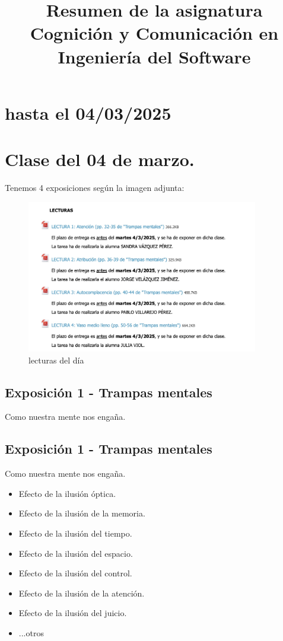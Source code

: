 \documentclass[12pt, a4paper, twoside]{article}
\title{Resumen de la asignatura Cognición y Comunicación en Ingeniería del Software}
\begin{document}
\maketitle

\section{hasta el 04/03/2025}

\section{Clase del 04 de marzo.}
Tenemos 4 exposiciones según la imagen adjunta:
\begin{figure}[h]
    \centering
    \includegraphics[width=0.9\textwidth]{./Images/0304.jpg}
    \caption{lecturas del día}
\end{figure}

\subsection{Exposición 1 - Trampas mentales}
Como nuestra mente nos engaña. \newline

\subsection{Exposición 1 - Trampas mentales}
Como nuestra mente nos engaña. \\
\begin{itemize}
    \item{Efecto de la ilusión óptica.}
    \item{Efecto de la ilusión de la memoria.}
    \item{Efecto de la ilusión del tiempo.}
    \item{Efecto de la ilusión del espacio.}
    \item{Efecto de la ilusión del control.}
    \item{Efecto de la ilusión de la atención.}
    \item{Efecto de la ilusión del juicio.}
\item {...otros}
\end{itemize}
\end{document}
